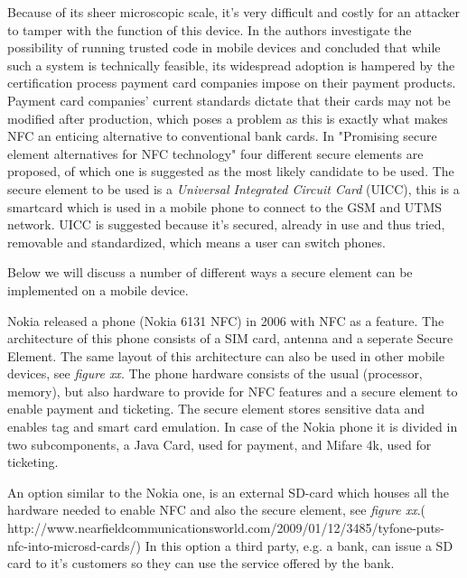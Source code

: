 Because of its sheer microscopic scale, it's very difficult and costly for an attacker to tamper with the function of this device.
In \cite{1497411} the authors investigate the possibility of running trusted code in mobile devices and concluded that while such a system is technically feasible, its widespread adoption is hampered by the certification process payment card companies impose on their payment products.
Payment card companies' current standards dictate that their cards may not be modified after production, which poses a problem as this is exactly what makes NFC an enticing alternative to conventional bank cards.
In "Promising secure element alternatives for NFC technology" four different secure elements are proposed, of which one is suggested as the most likely candidate to be used.
The secure element to be used is a \textit{Universal Integrated Circuit Card} (UICC), this is a smartcard which is used in a mobile phone to connect to the GSM and UTMS network. %
UICC is suggested because it's secured, already in use and thus tried, removable and standardized, which means a user can switch phones. 

Below we will discuss a number of different ways a secure element can be implemented on a mobile device. 


Nokia released a phone (Nokia 6131 NFC) in 2006 with NFC as a feature. The architecture of this phone consists of a SIM card, antenna and a seperate Secure Element. The same layout of this architecture can also be used in other mobile devices, see \textit{figure xx}. The phone hardware consists of the usual (processor, memory), but also hardware to provide for NFC features and a secure element to enable payment and ticketing. The secure element stores sensitive data and enables tag and smart card emulation. In case of the Nokia phone it is divided in two subcomponents, a Java Card, used for payment, and Mifare 4k, used for ticketing.


An option similar to the Nokia one, is an external SD-card which houses all the hardware needed to enable NFC and also the secure element, see \textit{figure xx}.( http://www.nearfieldcommunicationsworld.com/2009/01/12/3485/tyfone-puts-nfc-into-microsd-cards/)
In this option a third party, e.g. a bank, can issue a SD card to it's customers so they can use the service offered by the bank. 

